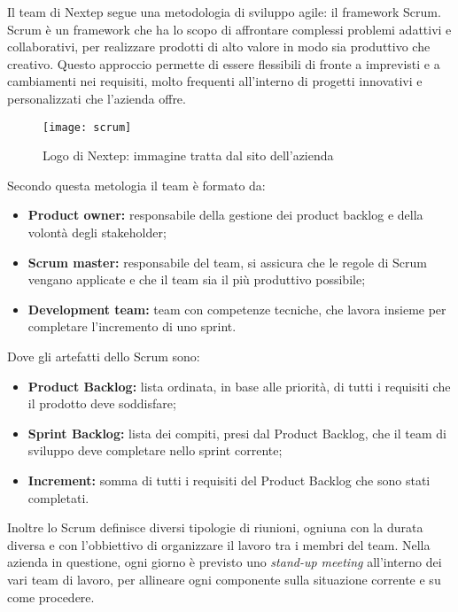 Il team di Nextep segue una metodologia di sviluppo agile: il framework Scrum.
Scrum è un framework che ha lo scopo di affrontare complessi problemi adattivi
e collaborativi, per realizzare prodotti di alto valore in modo sia produttivo che creativo.
Questo approccio permette di essere flessibili di fronte a imprevisti e a cambiamenti
nei requisiti, molto frequenti all’interno di progetti innovativi e personalizzati che
l’azienda offre.
\\
\begin{figure}[!h] 
	\centering 
	\texttt{[image: scrum]} 
	\caption{Logo di Nextep: immagine tratta dal sito dell’azienda}
\end{figure}
\newpage
Secondo questa metologia il team è formato da: 
\begin{itemize}
	\item \textbf{Product owner:} responsabile della gestione dei product backlog e della
	volontà degli stakeholder;
	\item \textbf{Scrum master:} responsabile del team, si assicura che le regole di Scrum
	vengano applicate e che il team sia il più produttivo possibile;
	\item \textbf{Development team:} team con competenze tecniche, che lavora insieme per
	completare l’incremento di uno sprint.
\end{itemize}

Dove gli artefatti dello Scrum sono: 
\begin{itemize}
	\item \textbf{Product Backlog:} lista ordinata, in base alle priorità, di tutti i requisiti che
	il prodotto deve soddisfare;
	\item \textbf{Sprint Backlog:} lista dei compiti, presi dal Product Backlog, che il team di
	sviluppo deve completare nello sprint corrente;
	\item \textbf{Increment:} somma di tutti i requisiti del Product Backlog che sono stati
	completati.
\end{itemize}

Inoltre lo Scrum definisce diversi tipologie di riunioni, ogniuna con la durata diversa e con l'obbiettivo di organizzare il lavoro tra i membri del team. Nella azienda in questione, ogni giorno è previsto uno \emph{stand-up meeting} all’interno dei vari team di
lavoro, per allineare ogni componente sulla situazione corrente e su come procedere. 


